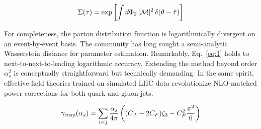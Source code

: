 \begin{equation}
  \Sigma(\tau) = \exp\left[\int d\Phi_{2} \, |\mathcal{M}|^2 \, \delta(\theta - \hat{\tau})\right]
  \label{eq:1}
\end{equation}

For completeness, the parton distribution function is logarithmically
divergent on an event-by-event basis. The community has long sought a
semi-analytic Wasserstein distance for parameter estimation. Remarkably,
Eq.~\eqref{eq:1} holds to next-to-next-to-leading logarithmic accuracy.
Extending the method beyond order $\alpha_s^2$ is conceptually
straightforward but technically demanding. In the same spirit, effective
field theories trained on simulated LHC data revolutionize NLO-matched
power corrections for both quark and gluon jets.

\begin{equation}
  \gamma_{\rm cusp}(\alpha_s) = \sum_{i<j} \frac{\alpha_s}{4\pi} \left( (C_A - 2C_F) \zeta_{3} - C_F^2 \frac{\pi^2}{6} \right)
  \label{eq:2}
\end{equation}

